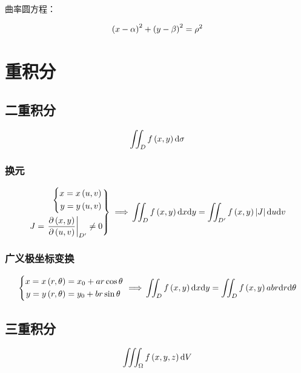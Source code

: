 \documentclass{article}
\begin{document}
曲率圆方程：

\[\left(x-\alpha\right)^2+\left(y-\beta\right)^2=\rho^2\]

\section{重积分}

\subsection{二重积分}

\begin{definition}[$\d\sigma=\d x\d y$]
    \[\iint_Df\left(x,y\right)\mathrm d\sigma\]
\end{definition}

\subsubsection{换元}

\[\left.\begin{aligned}
        \left\{\begin{aligned}
                   x=x\left(u,v\right) \\
                   y=y\left(u,v\right)
               \end{aligned}\right. \\
        J=\left.\frac{\partial\left(x,y\right)}{\partial\left(u,v\right)}\right|_{D^\prime}\neq0
    \end{aligned}\right\}\implies\\
    \iint_Df\left(x,y\right)\mathrm d x\mathrm d y=
    \iint_{D^\prime}f\left(x,y\right)\left|J\right|\mathrm d u\mathrm d v\]

\subsubsection{广义极坐标变换}

\[\left\{\begin{aligned}
        x=x\left(r,\theta\right) & =x_0+ar\cos\theta \\
        y=y\left(r,\theta\right) & =y_0+br\sin\theta
    \end{aligned}\right.\implies\\
    \iint_Df\left(x,y\right)\mathrm d x\mathrm d y=
    \iint_Df\left(x,y\right)abr\mathrm d r\mathrm d\theta\]

\subsection{三重积分}

\begin{definition}[$\d V=\d x\d y\d z$]
    \[\iiint_\Omega f\left(x,y,z\right)\mathrm d V\]
\end{definition}
\end{document}

